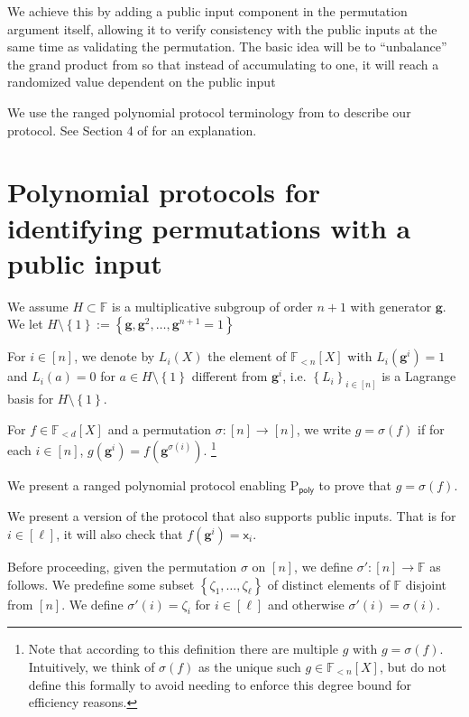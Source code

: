 \documentclass[11pt]{article} %
\newcommand{\F}{\ensuremath{\mathbb F}\xspace}
\newcommand{\sigof}[1]{\ensuremath{\sigma(#1)}\xspace}
\newcommand{\defeq}{:=}
\newcommand{\dom}{\ensuremath{H\setminus\set{1}}\xspace}
\newcommand{\sett}[2]{\ensuremath{\set{#1}_{#2}}\xspace}
\newcommand{\prvpoly}{\ensuremath{\mathrm{P_{\mathsf{poly}}}}\xspace}
\newcommand{\inp}{\ensuremath{\mathsf{x}}\xspace}
\newcommand{\set}[1]{\ensuremath{\left\{#1\right\}}\xspace}
\newcommand{\hgen}{\ensuremath{\mathbf{g}}\xspace}
\newcommand{\polysofdeg}[1]{\ensuremath{\F_{< #1}[X]}\xspace}
\newcommand{\sig}{\ensuremath{\sigma}\xspace}
\begin{document}
We achieve this by adding a public input component in the permutation argument itself, allowing it to verify consistency with the public inputs at the same time as validating the permutation.
The basic idea will be to ``unbalance'' the grand product from \cite{plonk} so that instead of accumulating to one,
it will reach a randomized value dependent on the public input


We use the ranged polynomial protocol terminology from \cite{plonk} to describe our protocol. See Section 4 of \cite{plonk} for an explanation.
\section{Polynomial protocols for identifying permutations with a public input}\label{sec:permprotocol}
 
We assume $H\subset \F$ is a multiplicative subgroup of order $n+1$ with generator \hgen.
We let $\dom \defeq \set{\hgen,\hgen^2,\ldots,\hgen^{n+1}=1}$

For $i\in [n]$, we denote by $L_i(X)$ the element of \polysofdeg{n} with $L_i(\hgen^{i})=1$ and $L_i(a)=0$ for $a\in \dom$ different from  $\hgen^{i}$, i.e. \sett{L_i}{i\in [n]} is a Lagrange basis for $\dom$.




For $f\in \polysofdeg{d}$ and a permutation $\sigma :[n]\to [n]$,
we write $g=\sigma(f)$ if for each $i\in [n]$, $g(\hgen^{i}) = f(\hgen^{\sigma(i)})$. \footnote{Note that according to this definition there are multiple $g$ with $g=\sigma(f)$. Intuitively, we think of \sigof{f} as the unique such $g\in \polysofdeg{n}$, but do not define this formally to avoid needing to enforce this degree bound for efficiency reasons.}

We present a ranged polynomial protocol enabling \prvpoly to prove that
$g=\sigof{f}$.

We present a version of the protocol that also supports public inputs.
That is for $i\in [\ell]$, it will also check that $f(\hgen^i) = \inp_i$.

Before proceeding, given the permutation $\sig$ on $[n]$, we define $\sig':[n]\to \F$ as follows.
We predefine some subset $\set{\zeta_1,\ldots,\zeta_\ell}$ of distinct elements of \F disjoint from $[n]$.
We define $\sig'(i) = \zeta_i$ for $i\in [\ell]$ and otherwise $\sig'(i) =\sig(i)$.
\end{document}
